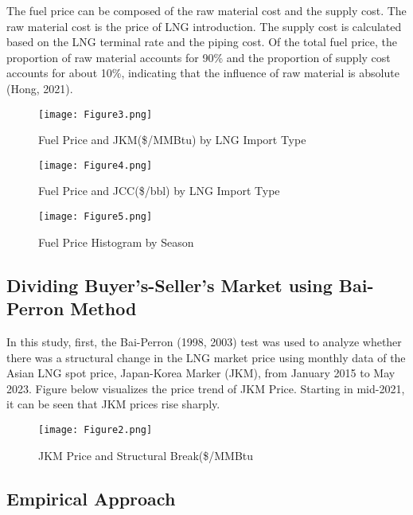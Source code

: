 \documentclass[leqno]{article}
\begin{document}
The fuel price can be composed of the raw material cost and the supply cost. The raw material cost is the price of LNG introduction. The supply cost is calculated based on the LNG terminal rate and the piping cost. Of the total fuel price, the proportion of raw material accounts for 90\% and the proportion of supply cost accounts for about 10\%, indicating that the influence of raw material is absolute (Hong, 2021).

\begin{figure}[htbp] 
    \centering
            \caption{Fuel Price and JKM(\$/MMBtu) by LNG Import Type}
        \texttt{[image: Figure3.png]}
        \label{fig:88mono}
\end{figure}

\begin{figure}[htbp] 
    \centering
            \caption{Fuel Price and JCC(\$/bbl) by LNG Import Type}
        \texttt{[image: Figure4.png]}
        \label{fig:88mono}
\end{figure}

\begin{figure}[htbp] 
    \centering
            \caption{Fuel Price Histogram by Season}
        \texttt{[image: Figure5.png]}
        \label{fig:88mono}
\end{figure}


\subsection{Dividing Buyer's-Seller's Market using Bai-Perron Method}


In this study, first, the Bai-Perron (1998, 2003) test was used to analyze whether there was a structural change in the LNG market price using monthly data of the Asian LNG spot price, Japan-Korea Marker (JKM), from January 2015 to May 2023. Figure below visualizes the price trend of JKM Price. Starting in mid-2021, it can be seen that JKM prices rise sharply.


\begin{figure}[htbp] 
    \centering
            \caption{JKM Price and Structural Break(\$/MMBtu}
        \texttt{[image: Figure2.png]}
        \label{fig:88mono}
\end{figure}






\subsection{Empirical Approach}
\end{document}
